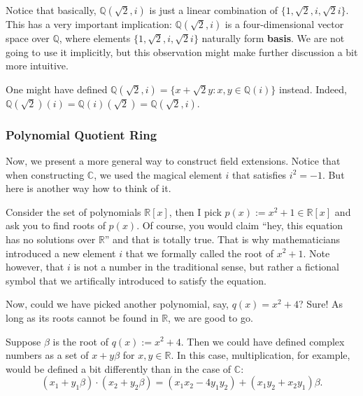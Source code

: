 \documentclass[../lecture-notes.tex]{subfiles}
\begin{document}
\begin{remark}
    Notice that basically, $\mathbb{Q}(\sqrt{2}, i)$ is just a linear combination of $\{1,\sqrt{2},i,\sqrt{2}i\}$. This has a very important implication: $\mathbb{Q}(\sqrt{2}, i)$ is a four-dimensional vector space over $\mathbb{Q}$, where elements $\{1,\sqrt{2},i,\sqrt{2}i\}$ naturally form \textbf{basis}. We are not going to use it implicitly, but this observation might make further discussion a bit more intuitive.
\end{remark}

\begin{remark}
    One might have defined $\mathbb{Q}(\sqrt{2}, i) = \{x+\sqrt{2}y: x,y \in \mathbb{Q}(i)\}$ instead. Indeed, $\mathbb{Q}(\sqrt{2})(i) = \mathbb{Q}(i)(\sqrt{2}) = \mathbb{Q}(\sqrt{2}, i)$.
\end{remark}

\subsubsection{Polynomial Quotient Ring}

Now, we present a more general way to construct field extensions. Notice that when constructing $\mathbb{C}$, we used the magical element $i$ that satisfies $i^2=-1$. But here is another way how to think of it.

Consider the set of polynomials $\mathbb{R}[x]$, then I pick $p(x):=x^2+1 \in \mathbb{R}[x]$ and ask you to find roots of $p(x)$. Of course, you would claim ``hey, this equation has no solutions over $\mathbb{R}$'' and that is totally true. That is why mathematicians introduced a new element $i$ that we formally called the root of $x^2+1$. Note however, that $i$ is not a number in the traditional sense, but rather a fictional symbol that we artifically introduced to satisfy the equation.

Now, could we have picked another polynomial, say, $q(x) = x^2+4$? Sure! As long as its roots cannot be found in $\mathbb{R}$, we are good to go.

\begin{example}
    Suppose $\beta$ is the root of $q(x):=x^2+4$. Then we could have defined complex numbers as a set of $x+y\beta$ for $x,y \in \mathbb{R}$. In this case, multiplication, for example, would be defined a bit differently than in the case of $\mathbb{C}$:
    \begin{equation*}
        (x_1+y_1\beta) \cdot (x_2+y_2\beta) = (x_1x_2-4y_1y_2) + (x_1y_2+x_2y_1)\beta.
    \end{equation*}
\end{example}
\end{document}
